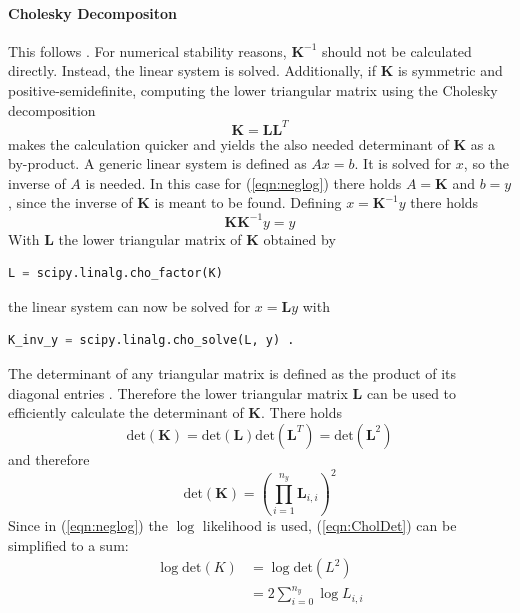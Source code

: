 \documentclass[%
  a4paper,oneside,%
  11pt,%
  smallchapters,
  style=printdev,
  extramargin,
  green,%
  rgb, <cmyk>
  ]{tubsbook}
\begin{document}
\paragraph{Cholesky Decompositon}
\label{sec:Cholesky}
This follows \cite[p.93-95]{chambers1998}.
For numerical stability reasons, $\bm{K}^{-1}$ should not be calculated directly. Instead, the linear system is solved. Additionally, if $\bm{K}$ is symmetric and positive-semidefinite, computing the lower triangular matrix using the Cholesky decomposition 
\begin{equation}
\bm{K} = \bm{L}\bm{L}^T
\end{equation}
makes the calculation quicker and yields the also needed determinant of $\bm{K}$ as a by-product. 
A generic linear system is defined as $A x = b$. It is solved for $x$, so the inverse of $A$ is needed. In this case for (\ref{eqn:neglog}) there holds $A=\bm{K}$ and $b = y$, since the inverse of $\bm{K}$ is meant to be found. Defining $x = \bm{K}^{-1}y$ there holds
\begin{equation}
\bm{K} \bm{K}^{-1}  y = y
\end{equation}
%
With $\bm{L}$ the lower triangular matrix of $\bm{K}$ obtained by 
\begin{lstlisting}[language=Python]
L = scipy.linalg.cho_factor(K)
\end{lstlisting}
the linear system can now be solved for $x = \bm{L}y$ with
\begin{lstlisting}[language=Python]
K_inv_y = scipy.linalg.cho_solve(L, y) .
\end{lstlisting}

The determinant of any triangular matrix is defined as the product of its diagonal entries \cite{tomaskovic-moore}. Therefore the lower triangular matrix $\bm{L}$ can be used to efficiently calculate the determinant of $\bm{K}$. There holds
\begin{equation}
\mathrm{det} (\bm{K}) = \mathrm{det} (\bm{L}) \mathrm{det} (\bm{L}^T) = \mathrm{det} (\bm{L} ^2)
\end{equation}
and therefore
\begin{equation}
\mathrm{det} (\bm{K}) = \left(    \prod_{i=1}^{n_y}  \bm{L}_{i,i}  \right)^2
\label{eqn:CholDet}
\end{equation}
%
Since in (\ref{eqn:neglog}) the $\log$ likelihood is used, (\ref{eqn:CholDet}) can be simplified to a sum:
%
\begin{align*}
\log{\mathrm{det} (K)} &= \log{\mathrm{det} (L^2)} \\
&= 2 \sum_{i=0}^{n_y} \log{L_{i,i}}
\end{align*}
\end{document}
